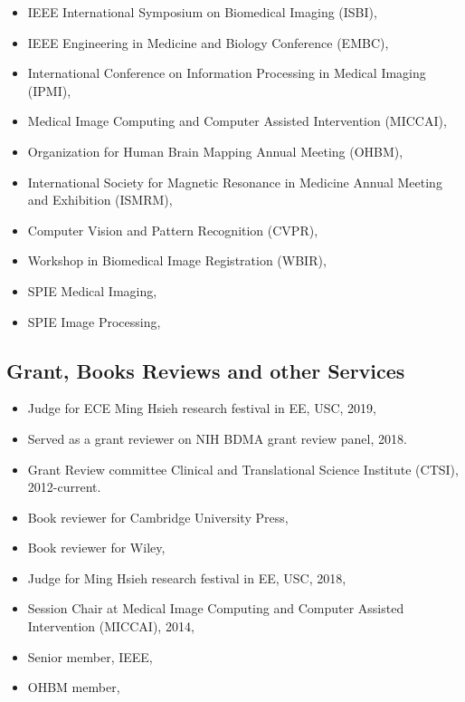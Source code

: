 \documentclass[overlapped,line,letterpaper]{res}
\begin{document}
\begin{resume}
\begin{multicols}{2}
\begin{itemize}
\item IEEE International Symposium on Biomedical Imaging (ISBI),
\item IEEE Engineering in Medicine and Biology Conference (EMBC),
\item International Conference on Information Processing in Medical Imaging (IPMI),
\item Medical Image Computing and Computer Assisted Intervention (MICCAI),
\item Organization for Human Brain Mapping Annual Meeting (OHBM),
\item International Society for Magnetic Resonance in Medicine Annual Meeting and Exhibition (ISMRM),
\item Computer Vision and Pattern Recognition (CVPR),
\item Workshop in Biomedical Image Registration (WBIR),
\item SPIE Medical Imaging,
\item SPIE Image Processing,
\end{itemize}
\end{multicols}

\subsection{Grant, Books Reviews and other Services}
    \begin{itemize}
\item Judge for ECE Ming Hsieh research festival in EE, USC, 2019,
\item Served as a grant reviewer on NIH BDMA grant review panel, 2018.
\item Grant Review committee Clinical and Translational Science Institute (CTSI), 2012-current.
\item Book reviewer for Cambridge University Press,
\item Book reviewer for Wiley,
\item Judge for Ming Hsieh research festival in EE, USC, 2018,
\item Session Chair at Medical Image Computing and Computer Assisted Intervention (MICCAI), 2014,
\item Senior member, IEEE, 
\item OHBM member,

\end{itemize}

\end{resume}
\end{document}
